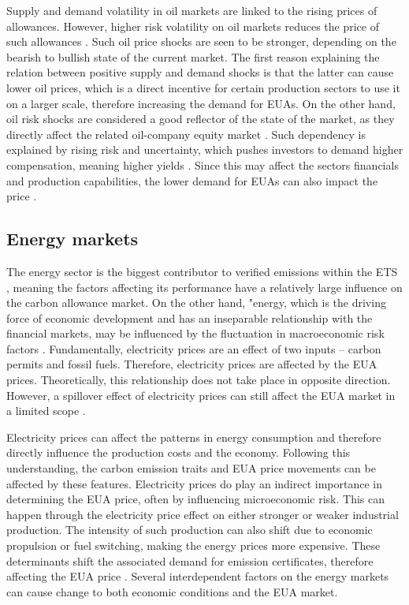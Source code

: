\documentclass[12pt, letterpaper]{article}
\begin{document}
Supply and demand volatility in oil markets are linked to the rising prices of allowances. However, higher risk volatility on oil markets reduces the price of such allowances \parencite{zheng2021}. Such oil price shocks are seen to be stronger, depending on the bearish to bullish state of the current market. The first reason explaining the relation between positive supply and demand shocks is that the latter can cause lower oil prices, which is a direct incentive for certain production sectors to use it on a larger scale, therefore increasing the demand for EUAs. On the other hand, oil risk shocks are considered a good reflector of the state of the market, as they directly affect the related oil-company equity market \parencite{zheng2021}. Such dependency is explained by rising risk and uncertainty, which pushes investors to demand higher compensation, meaning higher yields \parencite{tan2017}. Since this may affect the sectors financials and production capabilities, the lower demand for EUAs can also impact the price \parencite{zheng2021}. 

\subsection{Energy markets}

The energy sector is the biggest contributor to verified emissions within the ETS \parencite{eea}, meaning the factors affecting its performance have a relatively large influence on the carbon allowance market. On the other hand, "energy, which is the driving force of economic development and has an inseparable relationship with the financial markets, may be influenced by the fluctuation in macroeconomic risk factors \parencite{tan2017}. Fundamentally, electricity prices are an effect of two inputs – carbon permits and fossil fuels. Therefore, electricity prices are affected by the EUA prices. Theoretically, this relationship does not take place in opposite direction. However, a spillover effect of electricity prices can still affect the EUA market in a limited scope \parencite{lovcha2021}.

Electricity prices can affect the patterns in energy consumption and therefore directly influence the production costs and the economy. Following this understanding, the carbon emission traits and EUA price movements can be affected by these features. Electricity prices do play an indirect importance in determining the EUA price, often by influencing microeconomic risk. This can happen through the electricity price effect on either stronger or weaker industrial production.  The intensity of such production can also shift due to economic propulsion or fuel switching, making the energy prices more expensive. These determinants shift the associated demand for emission certificates, therefore affecting the EUA price \parencite{tan2017}. Several interdependent factors on the energy markets can cause change to both economic conditions and the EUA market.
\end{document}
